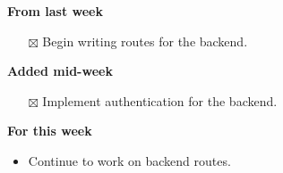 \documentclass[12pt,letterpaper]{article}
\newcommand{\done}{$\boxtimes$}
\begin{document}
\textbf{From last week}
\begin{itemize}
  \item[\done] Begin writing routes for the backend.
\end{itemize}

\textbf{Added mid-week}
\begin{itemize}
  \item[\done] Implement authentication for the backend.
\end{itemize}

\textbf{For this week}
\begin{itemize}
  \item Continue to work on backend routes.
\end{itemize}
\end{document}
